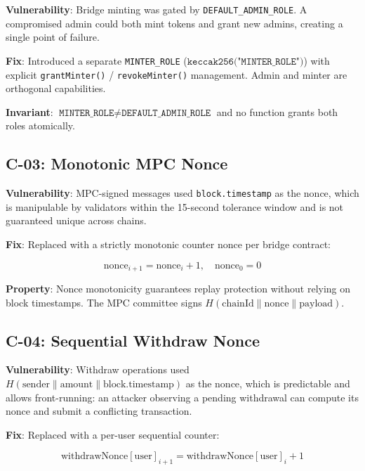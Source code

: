 \textbf{Vulnerability}: Bridge minting was gated by \texttt{DEFAULT\_ADMIN\_ROLE}. A compromised admin could both mint tokens and grant new admins, creating a single point of failure.

\textbf{Fix}: Introduced a separate \texttt{MINTER\_ROLE} ($\texttt{keccak256("MINTER\_ROLE")}$) with explicit \texttt{grantMinter()} / \texttt{revokeMinter()} management. Admin and minter are orthogonal capabilities.

\textbf{Invariant}: $\texttt{MINTER\_ROLE} \neq \texttt{DEFAULT\_ADMIN\_ROLE}$ and no function grants both roles atomically.

\subsection{C-03: Monotonic MPC Nonce}

\textbf{Vulnerability}: MPC-signed messages used \texttt{block.timestamp} as the nonce, which is manipulable by validators within the 15-second tolerance window and is not guaranteed unique across chains.

\textbf{Fix}: Replaced with a strictly monotonic counter nonce per bridge contract:

\begin{equation}
\text{nonce}_{i+1} = \text{nonce}_i + 1, \quad \text{nonce}_0 = 0
\end{equation}

\textbf{Property}: Nonce monotonicity guarantees replay protection without relying on block timestamps. The MPC committee signs $H(\text{chainId} \| \text{nonce} \| \text{payload})$.

\subsection{C-04: Sequential Withdraw Nonce}

\textbf{Vulnerability}: Withdraw operations used $H(\text{sender} \| \text{amount} \| \text{block.timestamp})$ as the nonce, which is predictable and allows front-running: an attacker observing a pending withdrawal can compute its nonce and submit a conflicting transaction.

\textbf{Fix}: Replaced with a per-user sequential counter:

\begin{equation}
\text{withdrawNonce}[\text{user}]_{i+1} = \text{withdrawNonce}[\text{user}]_i + 1
\end{equation}


